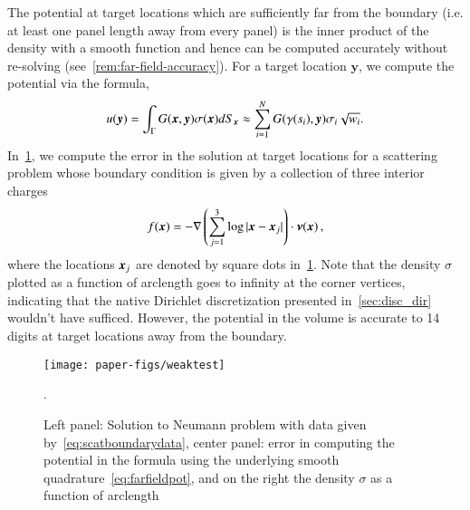 The potential at target locations which are sufficiently far from the boundary (i.e. at least one panel length away from 
every panel) is the inner product of the 
density with a smooth function and hence can be computed accurately without re-solving (see~\cref{rem:far-field-accuracy}). For a target 
location $\boldsymbol{y}$, we compute the potential via the formula,
\begin{equation}
\label{eq:farfieldpot}
u(\boldsymbol{y}) = \int_{\Gamma} G(\boldsymbol{x},\boldsymbol{y}) \sigma(\boldsymbol{x}) dS_{\boldsymbol{x}} \approx \sum_{i=1}^{N}  G(\gamma(s_{i}),\boldsymbol{y}) \sigma_{i} \sqrt{w_{i}}.
\end{equation}
In~\cref{fig:scatteringtest}, we compute the error in the solution at target
locations for a scattering problem whose {\color{olive}boundary condition} is given by a collection of three interior charges
\begin{equation}
\label{eq:scatboundarydata}
f(\boldsymbol{x}) = -\nabla  \left(\sum_{j=1}^{3} \log |\boldsymbol{x} - \boldsymbol{x}_{j}|  \right)  \cdot \boldsymbol{\nu}(\boldsymbol{x})\, ,  
\end{equation}
where the locations $\boldsymbol{x}_{j}$ are denoted by square dots in~\cref{fig:scatteringtest}. Note that the density $\sigma$ plotted
as a function of arclength goes to infinity at the corner vertices, indicating that the native Dirichlet discretization 
presented in~\cref{sec:disc_dir} wouldn't have sufficed. However, the potential in the volume is accurate to 14 digits at
target locations away from the boundary. 
\begin{figure}
\begin{center}
\texttt{[image: paper-figs/weaktest]}
\caption{Left panel: Solution to Neumann problem with data given by~\cref{eq:scatboundarydata}, center panel: error in computing the potential in the formula using the underlying smooth quadrature~\cref{eq:farfieldpot}, and on the right the density $\sigma$ as a function of arclength}.
\label{fig:scatteringtest}
\end{center}
\end{figure}


